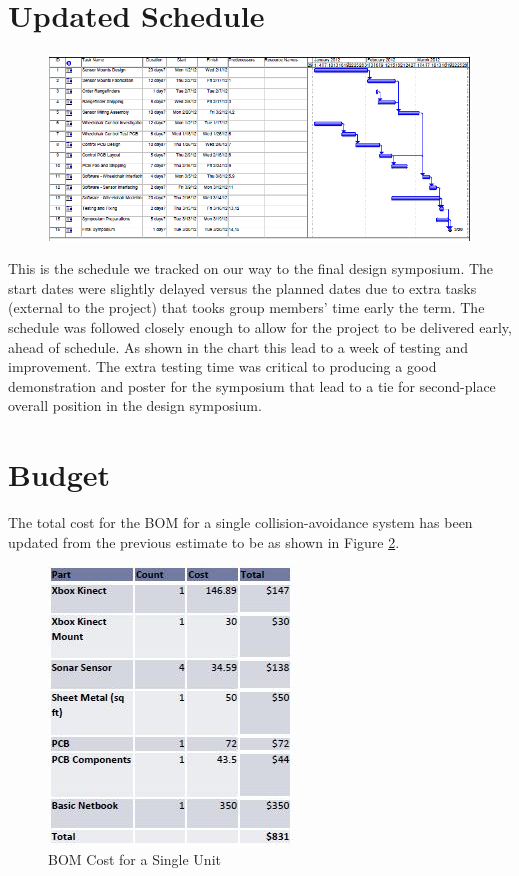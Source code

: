 \documentclass[oneside,final,a4paper]{report}
\begin{document}
\section{Updated Schedule}
\begin{figure}
 \centering
 \includegraphics[scale=0.55]{Final_Schedule} \label{fig:final_schel}
\end{figure}

This is the schedule we tracked on our way to the final design symposium. The start dates were slightly delayed versus the planned dates due to extra tasks (external to the project) that tooks group members' time early the term. The schedule was followed closely enough to allow for the project to be delivered early, ahead of schedule. As shown in the chart this lead to a week of testing and improvement. The extra testing time was critical to producing a good demonstration and poster for the symposium that lead to a tie for second-place overall position in the design symposium.

\section{Budget}
The total cost for the BOM for a single collision-avoidance system has been updated from the previous estimate to be as shown in Figure \ref{fig:BOM_single}.

\begin{figure}[hbt]
 \centering
 \includegraphics[scale=0.8]{BOM_single}
 \caption{BOM Cost for a Single Unit}
 \label{fig:BOM_single}
\end{figure}
\end{document}
